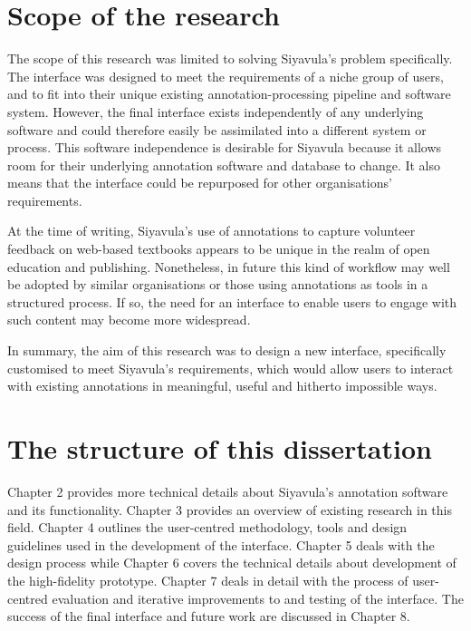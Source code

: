 \section{Scope of the research}
The scope of this research was limited to solving Siyavula's problem specifically. The interface was designed to meet the requirements of a niche group of users, and to fit into their unique existing annotation-processing pipeline and software system. However, the final interface exists independently of any underlying software and could therefore easily be assimilated into a different system or process. This software independence is desirable for Siyavula because it allows room for their underlying annotation software and database to change. It also means that the interface could be repurposed for other organisations' requirements.

At the time of writing, Siyavula's use of annotations to capture volunteer feedback on web-based textbooks appears to be unique in the realm of open education and publishing. Nonetheless, in future this kind of workflow may well be adopted by similar organisations or those using annotations as tools in a structured process. If so, the need for an interface to enable users to engage with such content may become more widespread. 

In summary, the aim of this research was to design a new interface, specifically customised to meet Siyavula's requirements, which would allow users to interact with existing annotations in meaningful, useful and hitherto impossible ways.

\section{The structure of this dissertation}

Chapter 2 provides more technical details about Siyavula's annotation software and its functionality. Chapter 3 provides an overview of existing research in this field. Chapter 4 outlines the user-centred methodology, tools and design guidelines used in the development of the interface. Chapter 5 deals with the design process while Chapter 6 covers the technical details about development of the high-fidelity prototype. Chapter 7 deals in detail with the process of user-centred evaluation and iterative improvements to and testing of the interface. The success of the final interface and future work are discussed in Chapter 8.   
